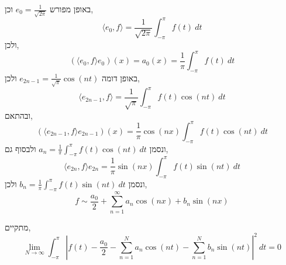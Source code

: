 \begin{remark}
	באופן מפורש $e_0 = \frac{1}{\sqrt{2 \pi}}$ וכן,
	\[
		\langle e_0, f \rangle = \frac{1}{\sqrt{2 \pi}} \int_{-\pi}^{\pi} f(t)\ dt
	\]
	ולכן,
	\[
		(\langle e_0, f \rangle e_0)(x)
		= a_0(x)
		= \frac{1}{\pi} \int_{-\pi}^{\pi} f(t)\ dt
	\]
	באופן דומה $e_{2n - 1} = \frac{1}{\sqrt{\pi}} \cos(nt)$ ולכן,
	\[
		\langle e_{2n - 1}, f \rangle
		= \frac{1}{\sqrt{\pi}} \int_{-\pi}^{\pi} f(t) \cos(nt)\ dt
	\]
	ובהתאם,
	\[
		(\langle e_{2n - 1}, f \rangle e_{2n - 1})(x)
		= \frac{1}{\pi} \cos(nx) \int_{-\pi}^{\pi} f(t) \cos(nt)\ dt
	\]
	ונסמן $a_n = \frac{1}{\pi} \int_{-\pi}^{\pi} f(t) \cos(nt)\ dt$
	ולבסוף גם,
	\[
		\langle e_{2n}, f \rangle e_{2n}
		= \frac{1}{\pi} \sin(nx) \int_{-\pi}^{\pi} f(t) \sin(nt)\ dt
	\]
	ונסמן $b_n = \frac{1}{\pi} \int_{-\pi}^{\pi} f(t) \sin(nt)\ dt$
	ולכן,
	\[
		f \sim \frac{a_0}{2} + \sum_{n = 1}^\infty a_n \cos(nx) + b_n \sin(nx)
	\]
\end{remark}
\begin{conclusion}
	מתקיים,
	\[
		\lim_{N \to \infty} 
		\int_{-\pi}^{\pi} {\left\lvert f(t) - \frac{a_0}{2} - \sum_{n = 1}^N a_n \cos(nt) - \sum_{n = 1}^N b_n \sin(nt) \right\rvert}^2\ dt
		= 0
	\]
\end{conclusion}

\listoftheorems[title=הגדרות ומשפטים,ignoreall,show={theorem,definition},swapnumber,onlynamed={proposition}]


